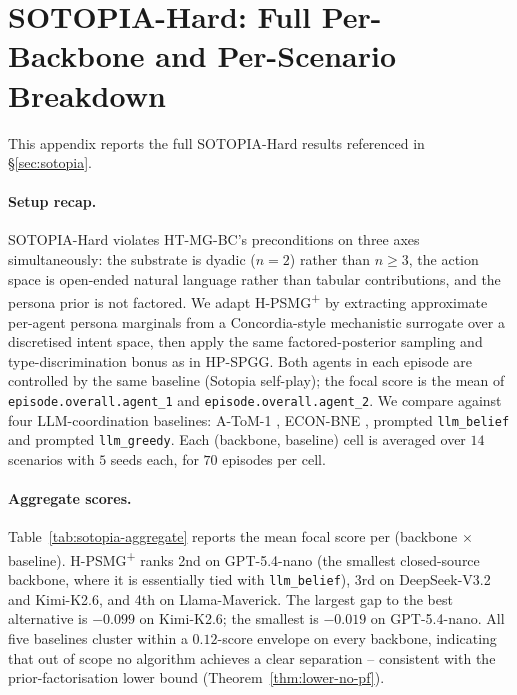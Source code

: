 \section{SOTOPIA-Hard: Full Per-Backbone and Per-Scenario Breakdown}
\label{app:sotopia-detail}

This appendix reports the full SOTOPIA-Hard results referenced in \S\ref{sec:sotopia}.

\paragraph{Setup recap.} SOTOPIA-Hard \citep{zhou2024sotopia} violates HT-MG-BC's preconditions on three axes simultaneously: the substrate is dyadic ($n{=}2$) rather than $n\!\geq\!3$, the action space is open-ended natural language rather than tabular contributions, and the persona prior is not factored. We adapt H-PSMG\textsuperscript{+} by extracting approximate per-agent persona marginals from a Concordia-style mechanistic surrogate over a discretised intent space, then apply the same factored-posterior sampling and type-discrimination bonus as in HP-SPGG. Both agents in each episode are controlled by the same baseline (Sotopia self-play); the focal score is the mean of \texttt{episode.overall.agent\_1} and \texttt{episode.overall.agent\_2}. We compare against four LLM-coordination baselines: A-ToM-1 \citep{xu2026atom}, ECON-BNE \citep{yang2025econ}, prompted \texttt{llm\_belief} and prompted \texttt{llm\_greedy}. Each (backbone, baseline) cell is averaged over $14$ scenarios with $5$ seeds each, for $70$ episodes per cell.

\paragraph{Aggregate scores.} Table~\ref{tab:sotopia-aggregate} reports the mean focal score per (backbone $\times$ baseline). H-PSMG\textsuperscript{+} ranks 2nd on GPT-5.4-nano (the smallest closed-source backbone, where it is essentially tied with \texttt{llm\_belief}), 3rd on DeepSeek-V3.2 and Kimi-K2.6, and 4th on Llama-Maverick. The largest gap to the best alternative is $-0.099$ on Kimi-K2.6; the smallest is $-0.019$ on GPT-5.4-nano. All five baselines cluster within a $0.12$-score envelope on every backbone, indicating that out of scope no algorithm achieves a clear separation -- consistent with the prior-factorisation lower bound (Theorem~\ref{thm:lower-no-pf}).

